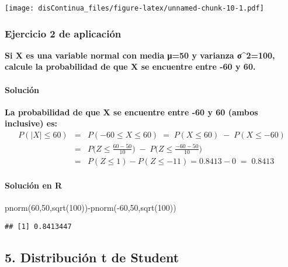 \documentclass[
]{article}
\newenvironment{Shaded}{\begin{snugshade}}{\end{snugshade}}
\newcommand{\DecValTok}[1]{\textcolor[rgb]{0.00,0.00,0.81}{#1}}
\newcommand{\FunctionTok}[1]{\textcolor[rgb]{0.00,0.00,0.00}{#1}}
\newcommand{\NormalTok}[1]{#1}
\newcommand{\SpecialCharTok}[1]{\textcolor[rgb]{0.00,0.00,0.00}{#1}}
\begin{document}
\texttt{[image: disContinua\_files/figure-latex/unnamed-chunk-10-1.pdf]}

\hypertarget{ejercicio-2-de-aplicaciuxf3n}{%
\subsubsection{Ejercicio 2 de
aplicación}\label{ejercicio-2-de-aplicaciuxf3n}}

\textbf{Si X es una variable normal con media μ=50 y varianza
σ\^{}2=100, calcule la probabilidad de que X se encuentre entre -60 y
60.}

\hypertarget{soluciuxf3n-3}{%
\paragraph{Solución}\label{soluciuxf3n-3}}

\textbf{La probabilidad de que X se encuentre entre -60 y 60 (ambos
inclusive) es:} \begin{eqnarray*}
    P(|X| \leq 60) &=& P(-60 \leq X  \leq 60)\; =\;  P(X\leq 60) \; - \; P(X\leq -60) \\
     &=&  P\Big(Z \leq \frac{60-50}{10}\Big) \; - \;  P\Big(Z \leq \frac{-60-50}{10}\Big)\\
     &=& P(Z \leq 1) - P(Z\leq -11) = 0.8413  - 0 \; =\; 0.8413
\end{eqnarray*}

\hypertarget{soluciuxf3n-en-r}{%
\paragraph{Solución en R}\label{soluciuxf3n-en-r}}

\begin{Shaded}
\begin{Highlighting}[]
\FunctionTok{pnorm}\NormalTok{(}\DecValTok{60}\NormalTok{,}\DecValTok{50}\NormalTok{,}\FunctionTok{sqrt}\NormalTok{(}\DecValTok{100}\NormalTok{))}\SpecialCharTok{{-}}\FunctionTok{pnorm}\NormalTok{(}\SpecialCharTok{{-}}\DecValTok{60}\NormalTok{,}\DecValTok{50}\NormalTok{,}\FunctionTok{sqrt}\NormalTok{(}\DecValTok{100}\NormalTok{))}
\end{Highlighting}
\end{Shaded}

\begin{verbatim}
## [1] 0.8413447
\end{verbatim}

\hypertarget{distribuciuxf3n-t-de-student}{%
\subsection{5. Distribución t de
Student}\label{distribuciuxf3n-t-de-student}}
\end{document}
